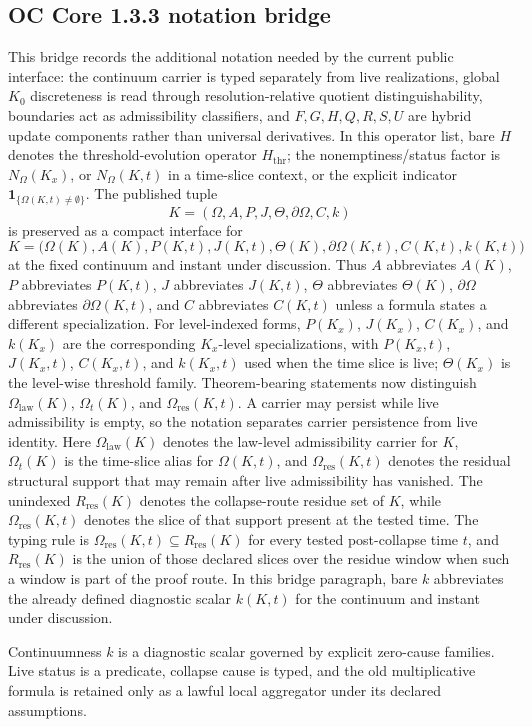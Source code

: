 \endgroup


\subsection{OC Core 1.3.3 notation bridge}
\label{sec:oc133-notation-scientific-closure-bridge}

This bridge records the additional notation needed by the current public
interface: the continuum carrier is typed separately from live realizations,
global \(K_0\) discreteness is read through resolution-relative quotient
distinguishability, boundaries act as admissibility classifiers, and
\(F,G,H,Q,R,S,U\) are hybrid update components rather than universal
derivatives.  In this operator list, bare \(H\) denotes the threshold-evolution
operator \(H_{\mathrm{thr}}\); the nonemptiness/status factor is
\(N_{\Omega}(K_x)\), or \(N_{\Omega}(K,t)\) in a time-slice context, or the explicit indicator
\(\mathbf{1}_{\{\Omega(K,t)\neq\emptyset\}}\).  The published tuple
\[
K=(\Omega,A,P,J,\Theta,\partial\Omega,C,k)
\]
is preserved as a compact interface for
\[
K=\big(\Omega(K),A(K),P(K,t),J(K,t),\Theta(K),
       \partial\Omega(K,t),C(K,t),k(K,t)\big)
\]
at the fixed continuum and instant under discussion.  Thus \(A\) abbreviates
\(A(K)\), \(P\) abbreviates \(P(K,t)\), \(J\) abbreviates \(J(K,t)\),
\(\Theta\) abbreviates \(\Theta(K)\), \(\partial\Omega\) abbreviates
\(\partial\Omega(K,t)\), and \(C\) abbreviates \(C(K,t)\) unless a formula
states a different specialization. For level-indexed forms, \(P(K_x)\),
\(J(K_x)\), \(C(K_x)\), and \(k(K_x)\) are the corresponding \(K_x\)-level
specializations, with \(P(K_x,t)\), \(J(K_x,t)\), \(C(K_x,t)\), and
\(k(K_x,t)\) used when the time slice is live; \(\Theta(K_x)\) is the
level-wise threshold family. Theorem-bearing statements now distinguish
\(\Omega_{\mathrm{law}}(K)\), \(\Omega_t(K)\), and
\(\Omega_{\mathrm{res}}(K,t)\).  A carrier may persist while live admissibility
is empty, so the notation separates carrier persistence from live identity.
Here \(\Omega_{\mathrm{law}}(K)\) denotes the law-level admissibility carrier
for \(K\), \(\Omega_t(K)\) is the time-slice alias for \(\Omega(K,t)\), and
\(\Omega_{\mathrm{res}}(K,t)\) denotes the residual structural support that may
remain after live admissibility has vanished. The unindexed
\(R_{\mathrm{res}}(K)\) denotes the collapse-route residue set of \(K\), while
\(\Omega_{\mathrm{res}}(K,t)\) denotes the slice of that support present at
the tested time. The typing rule is
\(\Omega_{\mathrm{res}}(K,t)\subseteq R_{\mathrm{res}}(K)\) for every tested
post-collapse time \(t\), and \(R_{\mathrm{res}}(K)\) is the union of those
declared slices over the residue window when such a window is part of the
proof route. In this bridge paragraph, bare
\(k\) abbreviates the already defined diagnostic scalar \(k(K,t)\) for the
continuum and instant under discussion.

Continuumness \(k\) is a diagnostic scalar governed by explicit zero-cause
families.  Live status is a predicate, collapse cause is typed, and the old
multiplicative formula is retained only as a lawful local aggregator under its
declared assumptions.

